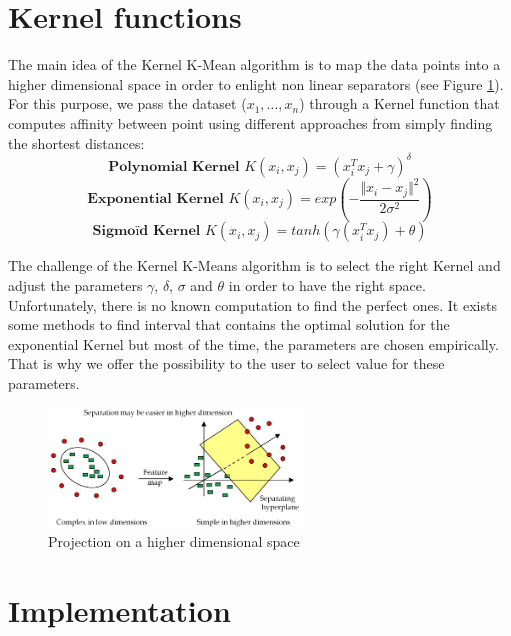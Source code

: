 \section{Kernel functions}
The main idea of the Kernel K-Mean algorithm is to map the data points into a higher dimensional space in order to enlight non linear separators (see Figure \ref{kern}). For this purpose, we pass the dataset ($x_1,...,x_n$) through a Kernel function that computes affinity between point using different approaches from simply finding the shortest distances:\\
\begin{equation}
\textbf{Polynomial Kernel }K(x_i,x_j) = (x_i^Tx_j + \gamma)^{\delta}
\end{equation}
\begin{equation}
\textbf{Exponential Kernel }K(x_i,x_j) = exp(-\frac{\Vert x_i-x_j\Vert^2}{2\sigma^2})
\end{equation}
\begin{equation}
\textbf{Sigmoïd Kernel }K(x_i,x_j) = tanh(\gamma (x_i^Tx_j) + \theta)
\end{equation}

The challenge of the Kernel K-Means algorithm is to select the right Kernel and adjust the parameters $\gamma$, $\delta$, $\sigma$ and $\theta$ in order to have the right space. Unfortunately, there is no known computation to find the perfect ones. It exists some methods to find interval that contains the optimal solution for the exponential Kernel but most of the time, the parameters are chosen empirically. That is why we offer the possibility to the user to select value for these parameters.
\begin{figure}[h!]
\includegraphics[width=0.6\textwidth]{Image/algo-kern.png}\centering
\caption{Projection on a higher dimensional space\label{kern}}
\end{figure}
\section{Implementation}